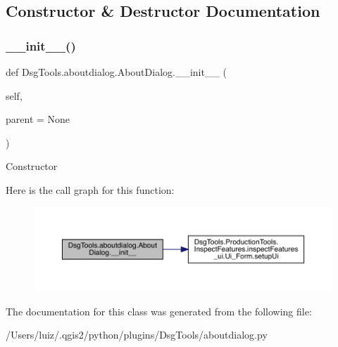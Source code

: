 \subsection{Constructor \& Destructor Documentation}
\mbox{\label{class_dsg_tools_1_1aboutdialog_1_1_about_dialog_a4e4a7a7ca8dbc93c459b91e46c473f9d}} 
\subsubsection{\texorpdfstring{\+\_\+\+\_\+init\+\_\+\+\_\+()}{\_\_init\_\_()}}
{\footnotesize\ttfamily def Dsg\+Tools.\+aboutdialog.\+About\+Dialog.\+\_\+\+\_\+init\+\_\+\+\_\+ (\begin{DoxyParamCaption}\item[{}]{self,  }\item[{}]{parent = {\ttfamily None} }\end{DoxyParamCaption})}

\begin{DoxyVerb}Constructor
\end{DoxyVerb}
 Here is the call graph for this function\+:
\nopagebreak
\begin{figure}[H]
\begin{center}
\leavevmode
\includegraphics[width=350pt]{class_dsg_tools_1_1aboutdialog_1_1_about_dialog_a4e4a7a7ca8dbc93c459b91e46c473f9d_cgraph}
\end{center}
\end{figure}


The documentation for this class was generated from the following file\+:\begin{DoxyCompactItemize}
\item 
/\+Users/luiz/.\+qgis2/python/plugins/\+Dsg\+Tools/aboutdialog.\+py\end{DoxyCompactItemize}
